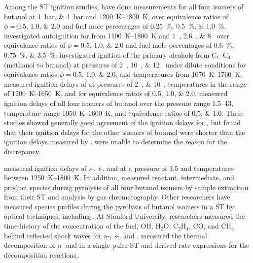 \documentclass[../main.tex]{subfiles}
\begin{document}
Among the ST ignition studies, \textcite{Moss2008} have done
measurements for all four isomers of butanol at \SIlist{1;4}{\bar} and
\SIrange{1200}{1800}{\kelvin}, over equivalence ratios of $\phi = \numlist{0.5;1.0;2.0}$
and fuel mole percentages of \SIlist{0.25;0.5;1.0}{\percent}.
\textcite{Black2010} investigated autoignition for \nBuOH{} from
\SIrange{1100}{1800}{\kelvin} and \SIlist{1;2.6;8}{\atmosphere} over equivalence ratios of
$\phi = \numlist{0.5;1.0;2.0}$ and fuel mole percentages of \SIlist{0.6;0.75;3.5}{\percent}.
\textcite{Noorani2010} investigated ignition of the primary alcohols
from C$_1$--C$_4$ (methanol to butanol) at pressures of \SIlist{2;10;12}{\atmosphere} under dilute
conditions for equivalence ratios $\phi = \numlist{0.5;1.0;2.0}$, and temperatures
from \SIrange{1070}{1760}{\kelvin}. \textcite{Zhang2012} measured ignition
delays of \nBuOH{} at pressures of \SIlist{2;10}{\atmosphere},
temperatures in the range of \SIrange{1200}{1650}{\kelvin}, and for equivalence
ratios of \numlist{0,5;1.0;2.0}. \textcite{Stranic2012} measured ignition
delays of all four isomers of butanol over the pressure range \SIrange{1.5}{43}{\atmosphere},
temperature range \SIrange{1050}{1600}{\kelvin}, and equivalence ratios of
\numlist{0.5;1.0}. These studies showed generally good agreement of
the ignition delays for \nBuOH{}, but \textcite{Stranic2012}
found that their ignition delays for the other isomers of butanol were
shorter than the ignition delays measured by \textcite{Moss2008}.
\textcite{Stranic2012} were unable to determine the reason for the
discrepancy.

\textcite{Yasunaga2012} measured ignition delays of \textit{s}-,
\textit{t}-, and \iBuOH{} at a pressure of \SI{3.5}{\atmosphere}
and temperatures between \SIrange{1250}{1800}{\kelvin}. In addition,
\textcite{Yasunaga2012} measured reactant, intermediate, and product
species during pyrolysis of all four butanol isomers by sample extraction
from their ST and analysis by gas chromatography. Other researchers
have measured species profiles during the pyrolysis of butanol isomers
in a ST by optical techniques, including \textcite{Cook2012, Stranic2012a, Stranic2013,
Rosado-Reyes2012a, Rosado-Reyes2012}. At Stanford University, researchers
measured the time-history of the concentration of the fuel, OH, H$_2$O, C$_2$H$_4$, CO, and CH$_4$
behind reflected shock waves for \textit{n}-, \textit{s}-,
and \iBuOH{} \cite{Cook2012, Stranic2012a, Stranic2013}.
\textcite{Rosado-Reyes2012a, Rosado-Reyes2012} measured the thermal
decomposition of \textit{n}- and \sBuOH{} in a
single-pulse ST and derived rate expressions for the decomposition
reactions.
\end{document}
